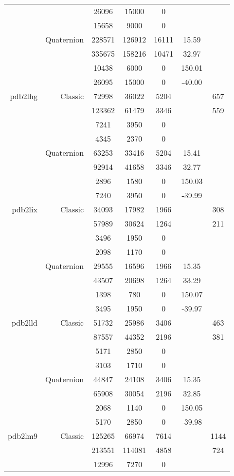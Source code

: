 \begin{xltabular}{\textwidth}{r|rcccSc}
& & 26096 & 15000 & 0 & & \\
& & 15658 & 9000 & 0 & & \\
& Quaternion & 228571 & 126912 & 16111 & 15.59 & \\
& & 335675 & 158216 & 10471 & 32.97 & \\
& & 10438 & 6000 & 0 & 150.01 & \\
& & 26095 & 15000 & 0 & -40.00 & \\ \addlinespace
pdb2lhg & Classic & 72998 & 36022 & 5204 & & 657 \\
& & 123362 & 61479 & 3346 & & 559 \\
& & 7241 & 3950 & 0 & & \\
& & 4345 & 2370 & 0 & & \\
& Quaternion & 63253 & 33416 & 5204 & 15.41 & \\
& & 92914 & 41658 & 3346 & 32.77 & \\
& & 2896 & 1580 & 0 & 150.03 & \\
& & 7240 & 3950 & 0 & -39.99 & \\ \addlinespace
pdb2lix & Classic & 34093 & 17982 & 1966 & & 308 \\
& & 57989 & 30624 & 1264 & & 211 \\
& & 3496 & 1950 & 0 & & \\
& & 2098 & 1170 & 0 & & \\
& Quaternion & 29555 & 16596 & 1966 & 15.35 & \\
& & 43507 & 20698 & 1264 & 33.29 & \\
& & 1398 & 780 & 0 & 150.07 & \\
& & 3495 & 1950 & 0 & -39.97 & \\ \addlinespace
pdb2lld & Classic & 51732 & 25986 & 3406 & & 463 \\
& & 87557 & 44352 & 2196 & & 381 \\
& & 5171 & 2850 & 0 & & \\
& & 3103 & 1710 & 0 & & \\
& Quaternion & 44847 & 24108 & 3406 & 15.35 & \\
& & 65908 & 30054 & 2196 & 32.85 & \\
& & 2068 & 1140 & 0 & 150.05 & \\
& & 5170 & 2850 & 0 & -39.98 & \\ \addlinespace
pdb2lm9 & Classic & 125265 & 66974 & 7614 & & 1144 \\
& & 213551 & 114081 & 4858 & & 724 \\
& & 12996 & 7270 & 0 & & \\

\end{xltabular}

